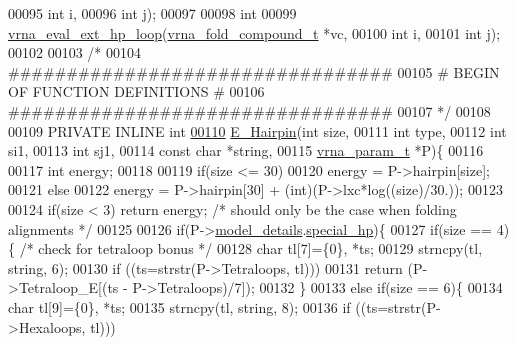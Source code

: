 \begin{DoxyCode}
00095                   \textcolor{keywordtype}{int} i,
00096                   \textcolor{keywordtype}{int} j);
00097 
00098 \textcolor{keywordtype}{int}
00099 \hyperlink{group__eval_gad3b92453a6b501856eec8fae39f3235d}{vrna\_eval\_ext\_hp\_loop}(\hyperlink{group__fold__compound_structvrna__fc__s}{vrna\_fold\_compound\_t} *vc,
00100                       \textcolor{keywordtype}{int} i,
00101                       \textcolor{keywordtype}{int} j);
00102 
00103 \textcolor{comment}{/*}
00104 \textcolor{comment}{#################################}
00105 \textcolor{comment}{# BEGIN OF FUNCTION DEFINITIONS #}
00106 \textcolor{comment}{#################################}
00107 \textcolor{comment}{*/}
00108 
00109 PRIVATE INLINE \textcolor{keywordtype}{int}
\hypertarget{hairpin__loops_8h_source_l00110}{}\hyperlink{group__loops_gadf943ee9a45b7f4cee9192c06210dace}{00110} \hyperlink{group__loops_gadf943ee9a45b7f4cee9192c06210dace}{E\_Hairpin}(\textcolor{keywordtype}{int} size,
00111           \textcolor{keywordtype}{int} type,
00112           \textcolor{keywordtype}{int} si1,
00113           \textcolor{keywordtype}{int} sj1,
00114           \textcolor{keyword}{const} \textcolor{keywordtype}{char} *\textcolor{keywordtype}{string},
00115           \hyperlink{group__energy__parameters_structvrna__param__s}{vrna\_param\_t} *P)\{
00116 
00117   \textcolor{keywordtype}{int} energy;
00118 
00119   \textcolor{keywordflow}{if}(size <= 30)
00120     energy = P->hairpin[size];
00121   \textcolor{keywordflow}{else}
00122     energy = P->hairpin[30] + (int)(P->lxc*log((size)/30.));
00123 
00124   \textcolor{keywordflow}{if}(size < 3) \textcolor{keywordflow}{return} energy; \textcolor{comment}{/* should only be the case when folding alignments */}
00125 
00126   \textcolor{keywordflow}{if}(P->\hyperlink{group__energy__parameters_a7b84353eb9075c595bad4ceb871bcae7}{model\_details}.\hyperlink{group__model__details_add64a96d23e77ef1d0ddf8dfc5228143}{special\_hp})\{
00127     \textcolor{keywordflow}{if}(size == 4)\{ \textcolor{comment}{/* check for tetraloop bonus */}
00128       \textcolor{keywordtype}{char} tl[7]=\{0\}, *ts;
00129       strncpy(tl, \textcolor{keywordtype}{string}, 6);
00130       \textcolor{keywordflow}{if} ((ts=strstr(P->Tetraloops, tl)))
00131         \textcolor{keywordflow}{return} (P->Tetraloop\_E[(ts - P->Tetraloops)/7]);
00132     \}
00133     \textcolor{keywordflow}{else} \textcolor{keywordflow}{if}(size == 6)\{
00134       \textcolor{keywordtype}{char} tl[9]=\{0\}, *ts;
00135       strncpy(tl, \textcolor{keywordtype}{string}, 8);
00136       \textcolor{keywordflow}{if} ((ts=strstr(P->Hexaloops, tl)))

\end{DoxyCode}
